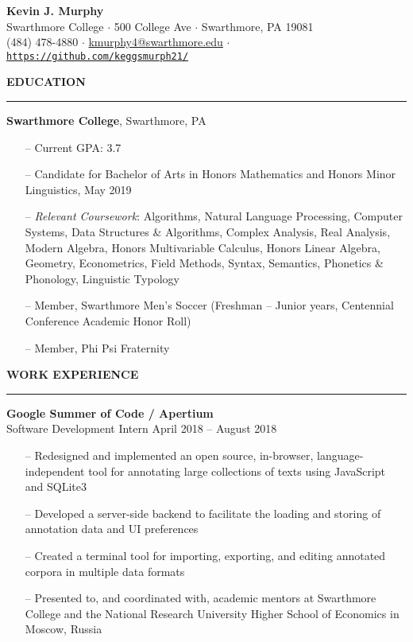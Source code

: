 \documentclass[paper=a4, fontsize=11pt]{scrartcl} %
\newcommand{\I}{--}
\newenvironment{mycenter}[1][\topsep]
  {\setlength{\topsep}{#1}\par\kern\topsep\centering}%
  {\par\kern\topsep}%
\begin{document}
\begin{mycenter}
\textbf{\LARGE Kevin J. Murphy} \\
Swarthmore College $\cdot$ 500 College Ave $\cdot$ Swarthmore, PA 19081 \\
(484) 478-4880 $\cdot$ \href{mailto:kmurphy4@swarthmore.edu}{kmurphy4@swarthmore.edu} $\cdot$ \texttt{\href{https://github.com/keggsmurph21/}{https://github.com/keggsmurph21/}}

\end{mycenter}

\begin{mycenter}[0pt]
\textsc{\textbf{EDUCATION}}
\end{mycenter}

\rule{\textwidth}{0.4pt}

\textbf{Swarthmore College}, Swarthmore, PA
\begin{itemize}[topsep=0pt,noitemsep]
  \item[\I] Current GPA: 3.7
	\item[\I] Candidate for Bachelor of Arts in Honors Mathematics and Honors Minor Linguistics, May 2019
	\item[\I] \textit{Relevant Coursework}: Algorithms, Natural Language Processing, Computer Systems, Data Structures \& Algorithms, Complex Analysis, Real Analysis, Modern Algebra, Honors Multivariable Calculus, Honors Linear Algebra, Geometry, Econometrics, Field Methods, Syntax, Semantics, Phonetics \& Phonology, Linguistic Typology
	\item[\I] Member, Swarthmore Men's Soccer (Freshman -- Junior years, Centennial Conference Academic Honor Roll)
	\item[\I] Member, Phi Psi Fraternity
\end{itemize}

\vspace{2mm}

\begin{mycenter}[0pt]
\textsc{\textbf{WORK EXPERIENCE}}
\end{mycenter}

\rule{\textwidth}{0.4pt}

\textbf{Google Summer of Code / Apertium}\\
Software Development Intern \hfill April 2018 -- August 2018
\begin{itemize}[topsep=0pt,noitemsep]
  \item[\I] Redesigned and implemented an open source, in-browser, language-independent tool for annotating large collections of texts using JavaScript and SQLite3
  \item[\I] Developed a server-side backend to facilitate the loading and storing of annotation data and UI preferences
  \item[\I] Created a terminal tool for importing, exporting, and editing annotated corpora in multiple data formats
  \item[\I] Presented to, and coordinated with, academic mentors at Swarthmore College and the National Research University Higher School of Economics in Moscow, Russia
\end{itemize}
\end{document}
